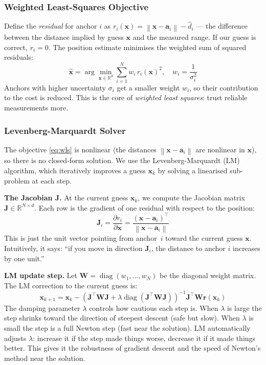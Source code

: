 \documentclass[11pt,a4paper]{article}
\newcommand{\vect}[1]{\bm{#1}}
\newcommand{\mat}[1]{\mathbf{#1}}
\newcommand{\norm}[1]{\left\|#1\right\|}
\newcommand{\Trans}{^{\top}}
\DeclareMathOperator{\diag}{diag}
\begin{document}
\subsubsection{Weighted Least-Squares Objective}

Define the \emph{residual} for anchor $i$ as $r_i(\vect{x}) = \norm{\vect{x} - \vect{a}_i} - \hat{d}_i$ --- the difference between the distance implied by guess $\vect{x}$ and the measured range. If our guess is correct, $r_i = 0$. The position estimate minimises the weighted sum of squared residuals:
\begin{equation}
\hat{\vect{x}} = \arg\min_{\vect{x} \in \mathbb{R}^d} \sum_{i=1}^{N} w_i \, r_i(\vect{x})^2, \quad w_i = \frac{1}{\sigma_i^2}
\label{eq:wls}
\end{equation}
Anchors with higher uncertainty $\sigma_i$ get a smaller weight $w_i$, so their contribution to the cost is reduced. This is the core of \emph{weighted least squares}: trust reliable measurements more.

\subsubsection{Levenberg-Marquardt Solver}

The objective \cref{eq:wls} is nonlinear (the distances $\norm{\vect{x}-\vect{a}_i}$ are nonlinear in $\vect{x}$), so there is no closed-form solution. We use the Levenberg-Marquardt (LM) algorithm, which iteratively improves a guess $\vect{x}_k$ by solving a linearised sub-problem at each step.

\textbf{The Jacobian $\mat{J}$.} At the current guess $\vect{x}_k$, we compute the Jacobian matrix $\mat{J} \in \mathbb{R}^{N \times d}$. Each row is the gradient of one residual with respect to the position:
\begin{equation}
\mat{J}_i = \frac{\partial r_i}{\partial \vect{x}} = \frac{(\vect{x} - \vect{a}_i)\Trans}{\norm{\vect{x} - \vect{a}_i}}
\label{eq:jacobian}
\end{equation}
This is just the unit vector pointing from anchor~$i$ toward the current guess $\vect{x}$. Intuitively, it says: ``if you move in direction $\mat{J}_i$, the distance to anchor $i$ increases by one unit.''

\textbf{LM update step.} Let $\mat{W} = \diag(w_1,\ldots,w_N)$ be the diagonal weight matrix. The LM correction to the current guess is:
\begin{equation}
\vect{x}_{k+1} = \vect{x}_k - \left(\mat{J}\Trans \mat{W} \mat{J} + \lambda \diag(\mat{J}\Trans \mat{W} \mat{J})\right)^{-1} \mat{J}\Trans \mat{W} \vect{r}(\vect{x}_k)
\label{eq:lm}
\end{equation}
The damping parameter $\lambda$ controls how cautious each step is. When $\lambda$ is large the step shrinks toward the direction of steepest descent (safe but slow). When $\lambda$ is small the step is a full Newton step (fast near the solution). LM automatically adjusts $\lambda$: increase it if the step made things worse, decrease it if it made things better. This gives it the robustness of gradient descent and the speed of Newton's method near the solution.
\end{document}
